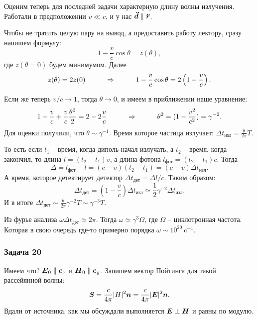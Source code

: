 Оценим теперь для последней задачи характерную длину волны излучения.
Работали в предположении $v \ll c$, и у нас $\mbox{\boldmath $\ddot{d}$} \parallel \mbox{\boldmath $\ddot{r}$}$.

Чтобы не тратить целую пару на вывод, а предоставить работу лектору, сразу напишем формулу:
\begin{equation*}
	1 - \frac{v}{c} \cos \theta = z (\theta),
\end{equation*}
где $z (\theta=0)$  будем минимумом. Далее
\begin{equation*}
	z(\theta) = 2 z (0)
	\hspace{1 cm}
	\Rightarrow
	\hspace{1 cm}
	1 - \frac{v}{c} \cos \theta = 2 \left(1 - \frac{v}{c}\right).
\end{equation*}

Если же теперь $v/c \to 1$, тогда $\theta \to 0$, и имеем в приближении наше уравнение:
\begin{equation*}
	1 - \frac{v}{c} + \frac{v}{c} \frac{\theta^2}{2} = 2 - 2 \frac{v}{c}
	\hspace{1 cm}
	\Rightarrow
	\hspace{1 cm}
	\theta^2 = (1 - \frac{v^2}{c^2}) = \gamma^{-2}.
\end{equation*}
Для оценки получили, что $\theta \sim \gamma^{-1}$. Время которое частица излучает: $\Delta t_{\text{изл}} = \frac{\theta}{2\pi} T$.

То есть если $t_1$ -- время, когда диполь начал излучать, а $t_2$ -- время, когда закончил, то длина $l = (t_2 - t_1)v$, а длина фотона $l_{\text{фот}} = (t_2 - t_1)c$.
Тогда \begin{equation*}
	\Delta = l_{\text{фот}} - l = (c-v)(t_2 - t_1) = (c-v) \Delta t_{\text{изл}}.
\end{equation*}
А время, которое детектирует детектор $\Delta t_\text{дет} = \Delta l/c$.
Таким образом:
\begin{equation*}
	\Delta t_{\text{дет}} = \left(1 - \frac{v}{c}\right) \Delta t_{\text{изл}} \simeq  \frac{1}{2} \gamma^{-2} \Delta t_{\text{изл}}.
\end{equation*}
И в итоге $\Delta t_{\text{дет}} \sim \frac{\theta}{2 \pi} \gamma^{-2} T \sim \gamma^{-3} T$.

Из фурье анализа $\omega \Delta t_\text{дет} \simeq 2 \pi$. Тогда $\omega \simeq \gamma^3 \Omega$, где $\Omega$ -- циклотронная частота. Которая в свою очередь где-то примерно порядка $\omega \sim 10^{20}\ \text{c}^{-1}$.

\subsubsection*{Задача 20}
Имеем что? $\mbox{\boldmath $E$}_0 \parallel \mbox{\boldmath $e$}_x$ и $\mbox{\boldmath $H$}_0 \parallel \mbox{\boldmath $e$}_y$. Запишем вектор Пойтинга для такой рассейянной волны:
\begin{equation*}
	\mbox{\boldmath $S$} = \frac{c}{4 \pi} |H|^2 \mbox{\boldmath $n$} = \frac{c}{4 \pi} |\mbox{\boldmath $E$}|^2 \mbox{\boldmath $n$}.
\end{equation*}
Вдали от источника, как мы обсуждали выполняется $\mbox{\boldmath $E$} \perp \mbox{\boldmath $H$}$ и равны по модулю.

